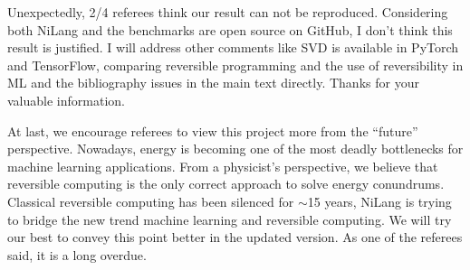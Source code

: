 \documentclass{article}
\begin{document}
Unexpectedly, 2/4 referees think our result can not be reproduced. Considering both NiLang and the benchmarks are open source on GitHub, I don't think this result is justified.
I will address other comments like SVD is available in PyTorch and TensorFlow,
comparing reversible programming and the use of reversibility in ML and the bibliography issues in the main text directly. Thanks for your valuable information.

At last, we encourage referees to view this project more from the ``future'' perspective.
Nowadays, energy is becoming one of the most deadly bottlenecks for machine learning applications.
From a physicist's perspective, we believe that reversible computing is the only correct approach to solve energy conundrums.
Classical reversible computing has been silenced for $\sim$15 years, NiLang is trying to bridge the new trend machine learning and reversible computing.
We will try our best to convey this point better in the updated version. As one of the referees said, it is a long overdue.
\end{document}
